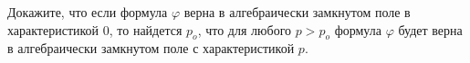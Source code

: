 Докажите, что если формула $\varphi$ верна в алгебраически замкнутом поле в характеристикой $0$, то найдется $p_o$, что для
любого $p > p_o$ формула $\varphi$ будет верна в алгебраически замкнутом поле с характеристикой $p$.